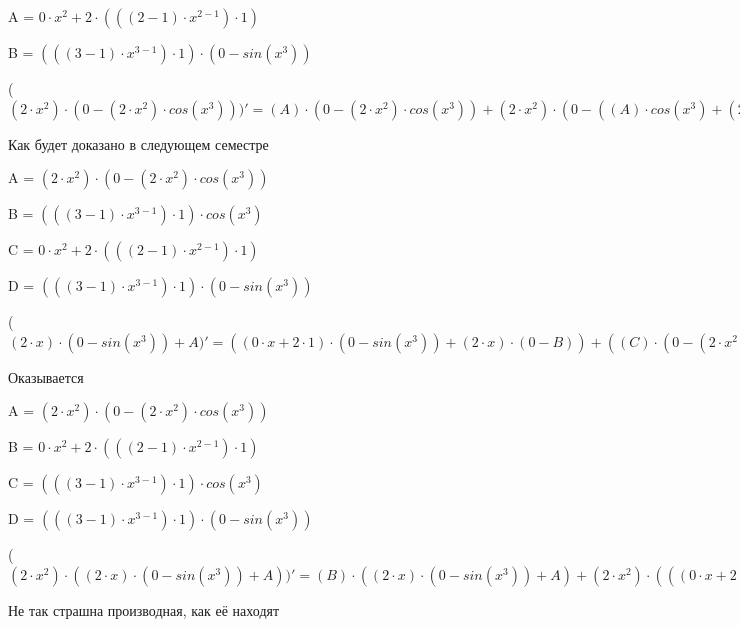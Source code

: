 \documentclass[12pt,a4paper,fleqn]{article}
\begin{document}
\begin{center}
A = $0 \cdot x^{2}+2 \cdot (((2-1) \cdot x^{2-1}) \cdot 1)$\end{center}
\begin{center}
B = $(((3-1) \cdot x^{3-1}) \cdot 1) \cdot (0-sin(x^{3}))$\end{center}
\begin{center}
 ($(2 \cdot x^{2}) \cdot (0-(2 \cdot x^{2}) \cdot cos(x^{3})))'
  = (A) \cdot (0-(2 \cdot x^{2}) \cdot cos(x^{3}))+(2 \cdot x^{2}) \cdot (0-((A) \cdot cos(x^{3})+(2 \cdot x^{2}) \cdot (B)))$\end{center}
Как будет доказано в следующем семестре

\begin{center}
A = $(2 \cdot x^{2}) \cdot (0-(2 \cdot x^{2}) \cdot cos(x^{3}))$\end{center}
\begin{center}
B = $(((3-1) \cdot x^{3-1}) \cdot 1) \cdot cos(x^{3})$\end{center}
\begin{center}
C = $0 \cdot x^{2}+2 \cdot (((2-1) \cdot x^{2-1}) \cdot 1)$\end{center}
\begin{center}
D = $(((3-1) \cdot x^{3-1}) \cdot 1) \cdot (0-sin(x^{3}))$\end{center}
\begin{center}
 ($(2 \cdot x) \cdot (0-sin(x^{3}))+A)'
  = ((0 \cdot x+2 \cdot 1) \cdot (0-sin(x^{3}))+(2 \cdot x) \cdot (0-B))+((C) \cdot (0-(2 \cdot x^{2}) \cdot cos(x^{3}))+(2 \cdot x^{2}) \cdot (0-((C) \cdot cos(x^{3})+(2 \cdot x^{2}) \cdot (D))))$\end{center}
Оказывается

\begin{center}
A = $(2 \cdot x^{2}) \cdot (0-(2 \cdot x^{2}) \cdot cos(x^{3}))$\end{center}
\begin{center}
B = $0 \cdot x^{2}+2 \cdot (((2-1) \cdot x^{2-1}) \cdot 1)$\end{center}
\begin{center}
C = $(((3-1) \cdot x^{3-1}) \cdot 1) \cdot cos(x^{3})$\end{center}
\begin{center}
D = $(((3-1) \cdot x^{3-1}) \cdot 1) \cdot (0-sin(x^{3}))$\end{center}
\begin{center}
 ($(2 \cdot x^{2}) \cdot ((2 \cdot x) \cdot (0-sin(x^{3}))+A))'
  = (B) \cdot ((2 \cdot x) \cdot (0-sin(x^{3}))+A)+(2 \cdot x^{2}) \cdot (((0 \cdot x+2 \cdot 1) \cdot (0-sin(x^{3}))+(2 \cdot x) \cdot (0-C))+((B) \cdot (0-(2 \cdot x^{2}) \cdot cos(x^{3}))+(2 \cdot x^{2}) \cdot (0-((B) \cdot cos(x^{3})+(2 \cdot x^{2}) \cdot (D)))))$\end{center}
Не так страшна производная, как её находят\cite{link2}
\end{document}
